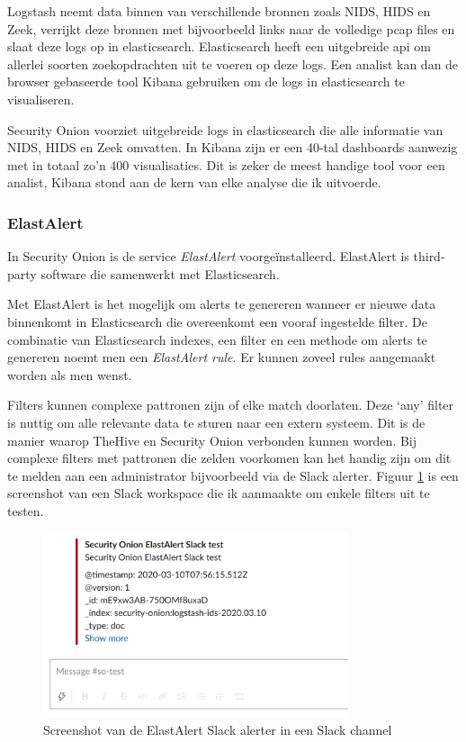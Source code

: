 \documentclass[a4paper,12pt]{report}
\begin{document}
Logstash neemt data binnen van verschillende bronnen zoals NIDS, HIDS en Zeek, verrijkt deze bronnen met bijvoorbeeld links naar de volledige pcap files en slaat deze logs op in elasticsearch.
Elasticsearch heeft een uitgebreide api om allerlei soorten zoekopdrachten uit te voeren op deze logs.
Een analist kan dan de browser gebaseerde tool Kibana gebruiken om de logs in elasticsearch te visualiseren.
\autocite{elastic:what-is-elk}

Security Onion voorziet uitgebreide logs in elasticsearch die alle informatie van NIDS, HIDS en Zeek omvatten.
In Kibana zijn er een 40-tal dashboards aanwezig met in totaal zo'n 400 visualisaties.
Dit is zeker de meest handige tool voor een analist, Kibana stond aan de kern van elke analyse die ik uitvoerde.

\subsubsection{ElastAlert}
In Security Onion is de service \emph{ElastAlert} voorgeïnstalleerd.
ElastAlert is third-party software die samenwerkt met Elasticsearch.

Met ElastAlert is het mogelijk om alerts te genereren wanneer er nieuwe data binnenkomt in Elasticsearch die overeenkomt een vooraf ingestelde filter.
De combinatie van Elasticsearch indexes, een filter en een methode om alerts te genereren noemt men een \emph{ElastAlert rule}.
Er kunnen zoveel rules aangemaakt worden als men wenst.

Filters kunnen complexe pattronen zijn of elke match doorlaten.
Deze `any' filter is nuttig om alle relevante data te sturen naar een extern systeem.
Dit is de manier waarop TheHive en Security Onion verbonden kunnen worden.
Bij complexe filters met pattronen die zelden voorkomen kan het handig zijn om dit te melden aan een administrator bijvoorbeeld via de Slack alerter.
Figuur \ref{fig:elastalert-slack} is een screenshot van een Slack workspace die ik aanmaakte om enkele filters uit te testen.

\begin{figure}[H]
  \centering
  \includegraphics[width=0.8\textwidth]{elastalert-slack}
  \caption{Screenshot van de ElastAlert Slack alerter in een Slack channel}
  \label{fig:elastalert-slack}
\end{figure}
\end{document}
